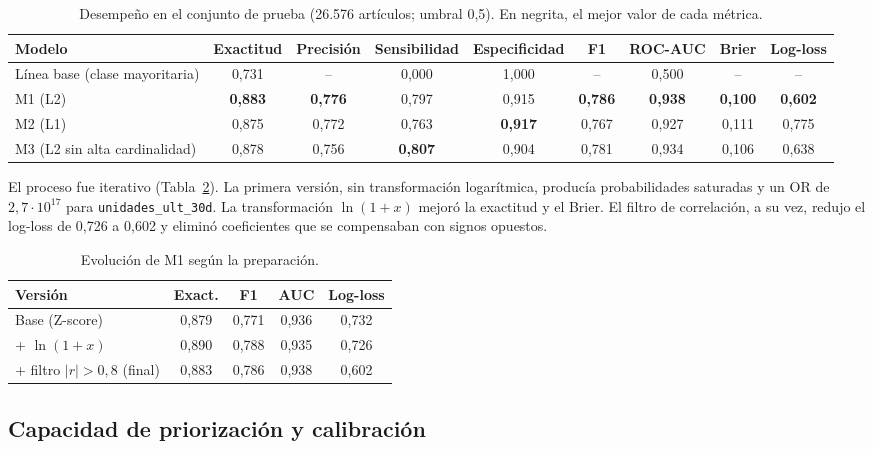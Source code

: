 \documentclass[
  journal=largetwo,
  manuscript=Laboratorio-Numero-02,
  year=2026,
  volume=1
]{cup-journal}
\begin{document}
\begin{table}[!ht]
\centering\footnotesize
\caption{Desempeño en el conjunto de prueba (26.576 artículos; umbral 0,5). En negrita, el mejor valor de cada métrica.}
\label{tab:metricas}
\begin{tabular}{@{}lcccccccc@{}}
\toprule
Modelo & Exactitud & Precisión & Sensibilidad & Especificidad & F1 & ROC-AUC & Brier & Log-loss \\
\midrule
Línea base (clase mayoritaria) & 0,731 & -- & 0,000 & 1,000 & -- & 0,500 & -- & -- \\
M1 (L2) & \textbf{0,883} & \textbf{0,776} & 0,797 & 0,915 & \textbf{0,786} & \textbf{0,938} & \textbf{0,100} & \textbf{0,602} \\
M2 (L1) & 0,875 & 0,772 & 0,763 & \textbf{0,917} & 0,767 & 0,927 & 0,111 & 0,775 \\
M3 (L2 sin alta cardinalidad) & 0,878 & 0,756 & \textbf{0,807} & 0,904 & 0,781 & 0,934 & 0,106 & 0,638 \\
\bottomrule
\end{tabular}
\end{table}

El proceso fue iterativo (Tabla~\ref{tab:evolucion}). La primera versión, sin transformación logarítmica, producía probabilidades saturadas y un OR de $2{,}7\cdot10^{17}$ para \texttt{unidades\_ult\_30d}. La transformación $\ln(1+x)$ mejoró la exactitud y el Brier. El filtro de correlación, a su vez, redujo el log-loss de 0,726 a 0,602 y eliminó coeficientes que se compensaban con signos opuestos.

\begin{table}[!ht]
\centering\footnotesize
\caption{Evolución de M1 según la preparación.}
\label{tab:evolucion}
\begin{tabular}{@{}lcccc@{}}
\toprule
Versión & Exact. & F1 & AUC & Log-loss \\
\midrule
Base (Z-score) & 0,879 & 0,771 & 0,936 & 0,732 \\
+ $\ln(1+x)$ & 0,890 & 0,788 & 0,935 & 0,726 \\
+ filtro $|r|>0{,}8$ (final) & 0,883 & 0,786 & 0,938 & 0,602 \\
\bottomrule
\end{tabular}
\end{table}

\subsection{Capacidad de priorización y calibración}
\end{document}
